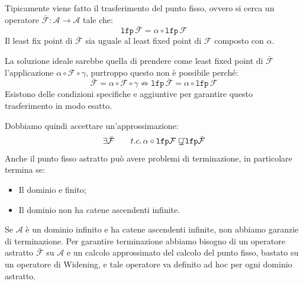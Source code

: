 Tipicamente viene fatto il trasferimento del punto fisso, ovvero si cerca un 
operatore $\bar{\mathcal{F}}: \mathcal{A} \rightarrow \mathcal{A}$ tale che:
\[
  \texttt{lfp} \,\bar{\mathcal{F}} = \alpha \circ \texttt{lfp} \,\mathcal{F}
\]
Il least fix point di $\bar{\mathcal{F}}$ sia uguale al least fixed point di
$\mathcal{F}$ composto con $\alpha$.

La soluzione ideale sarebbe quella di prendere come least fixed point di
$\bar{\mathcal{F}}$ l'applicazione $\alpha \circ \mathcal{F} \circ \gamma$, purtroppo
questo non è possibile perché:
\[
    \bar{\mathcal{F}} = \alpha \circ \mathcal{F} \circ \gamma 
    \not\Rightarrow \texttt{lfp} \,\bar{\mathcal{F}} = \alpha \circ \texttt{lfp} \,\mathcal{F}
\]
Esistono delle condizioni specifiche e aggiuntive per garantire questo 
trasferimento in modo esatto.

Dobbiamo quindi accettare un'approssimazione:
\[
  \exists \bar{\mathcal{F}}\qquad t.c.\, \alpha \circ \texttt{lfp} \mathcal{F} 
  \sqsubseteq\kern-0.7em/
  \texttt{lfp} \bar{\mathcal{F}}
\]
Anche il punto fisso astratto può avere problemi di terminazione, in 
particolare termina se:
\begin{itemize}
    \item Il dominio e finito;
    \item Il dominio non ha catene ascendenti infinite.
\end{itemize}
Se $\mathcal{A}$ è un dominio infinito e ha catene ascendenti infinite, non abbiamo 
garanzie di terminazione. Per garantire terminazione abbiamo bisogno di un operatore astratto 
$\bar{\mathcal{F}}$ su $\mathcal{A}$ e un calcolo approssimato del calcolo del punto fisso, bastato 
su un operatore di Widening, e tale operatore va definito ad hoc per ogni dominio astratto.
